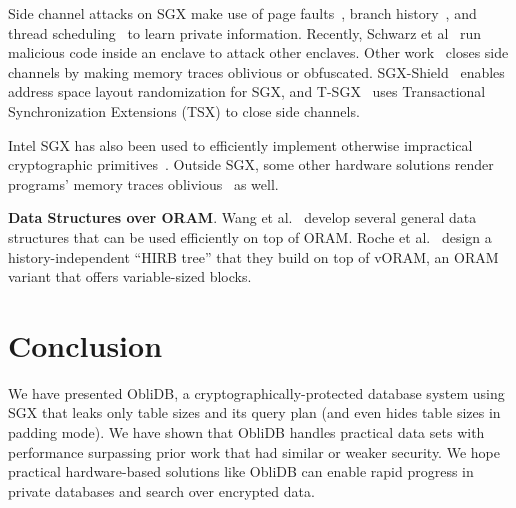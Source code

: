 \documentclass[letterpaper,twocolumn,10pt]{article}
\def\name/{ObliDB}
\begin{document}
Side channel attacks on SGX make use of page faults~\cite{XCP15, BMD+17}, branch history~\cite{LSG+16}, and thread scheduling~\cite{WKPK16} to learn private information. Recently, Schwarz et al~\cite{SWG+17} run malicious code inside an enclave to attack other enclaves. Other work~\cite{SCNS16, RLT15} closes side channels by making memory traces oblivious or obfuscated. SGX-Shield~\cite{SLK+17} enables address space layout randomization for SGX, and T-SGX~\cite{SLKP17} uses Transactional Synchronization Extensions (TSX) to close side channels.

Intel SGX has also been used to efficiently implement otherwise impractical cryptographic primitives~\cite{FVBG16, NFR+17}. Outside SGX, some other hardware solutions render programs' memory traces oblivious~\cite{CLD16, LHM+15, MLS+13} as well.

  \noindent \textbf{Data Structures over ORAM}. Wang et al.~\cite{WNL+14} develop several general data structures that can be used efficiently on top of ORAM. Roche et al.~\cite{RAC16} design a history-independent ``HIRB tree'' that they build on top of vORAM, an ORAM variant that offers variable-sized blocks.

\section{Conclusion}\label{conclusion}
We have presented \name/, a cryptographically-protected database system using SGX that leaks only table sizes and its query plan (and even hides table sizes in padding mode). We have shown that \name/ handles practical data sets with performance surpassing prior work that had similar or weaker security. We hope practical hardware-based solutions like \name/ can enable rapid progress in private databases and search over encrypted data.


{\small 
}


\end{document}
